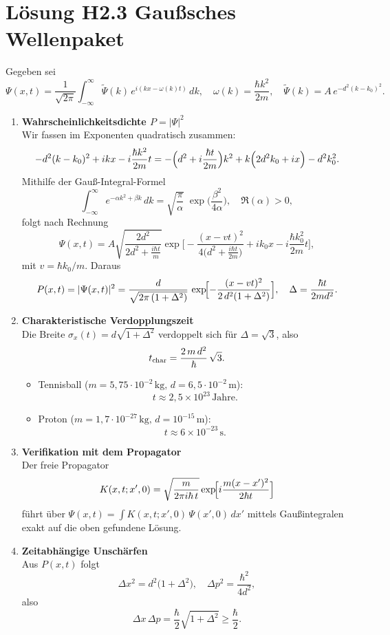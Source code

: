 \documentclass[a4paper,12pt]{article}
\begin{document}
\section*{Lösung H2.3 Gaußsches Wellenpaket}

Gegeben sei
\[
\Psi(x,t)
=\frac{1}{\sqrt{2\pi}}
\int_{-\infty}^{\infty}
\tilde\Psi(k)\,e^{i(kx-\omega(k)t)}\,dk,
\quad
\omega(k)=\frac{\hbar k^2}{2m},
\quad
\tilde\Psi(k)=A\,e^{-d^2(k-k_0)^2}.
\]

\begin{enumerate}[label=(\alph*)]

\item \textbf{Wahrscheinlichkeitsdichte \(P=|\Psi|^2\)}\\
Wir fassen im Exponenten quadratisch zusammen:
\[
-d^2(k-k_0)^2 + i k x - i\frac{\hbar k^2}{2m}t
=
-\Bigl(d^2 + i\frac{\hbar t}{2m}\Bigr)k^2
+ k\Bigl(2d^2k_0 + i x\Bigr)
- d^2k_0^2.
\]
Mithilfe der Gauß-Integral-Formel
\[
\int_{-\infty}^\infty e^{-\alpha k^2+\beta k}\,dk
=\sqrt{\frac{\pi}{\alpha}}\;
\exp\!\biggl(\frac{\beta^2}{4\alpha}\biggr),
\quad \Re(\alpha)>0,
\]
folgt nach Rechnung
\[
\Psi(x,t)
=A\sqrt{\frac{2d^2}{2d^2 + \tfrac{i\hbar t}{m}}}
\exp\!\Biggl[
-\frac{(x-vt)^2}{4\bigl(d^2 + \tfrac{i\hbar t}{2m}\bigr)}
+ i k_0 x - i\frac{\hbar k_0^2}{2m}t
\Biggr],
\]
mit \(v=\hbar k_0/m\). Daraus
\[
P(x,t)=|\Psi(x,t)|^2
=\frac{d}{\sqrt{2\pi\,(1+\Delta^2)}}\,
\exp\!\Bigl[-\frac{(x-vt)^2}{2\,d^2(1+\Delta^2)}\Bigr],
\quad
\Delta=\frac{\hbar t}{2 m d^2}.
\]

\item \textbf{Charakteristische Verdopplungszeit}\\
Die Breite \(\sigma_x(t)=d\sqrt{1+\Delta^2}\) verdoppelt sich für
\(\Delta=\sqrt{3}\), also
\[
t_{\rm char}
=\frac{2\,m\,d^2}{\hbar}\,\sqrt{3}.
\]
\begin{itemize}[leftmargin=*]
  \item Tennisball (\(m=5,75\cdot10^{-2}\,\mathrm{kg},\,d=6,5\cdot10^{-2}\,\mathrm m\)):
  \[
  t\approx2{,}5\times10^{23}\,\mathrm{Jahre}.
  \]
  \item Proton (\(m=1,7\cdot10^{-27}\,\mathrm{kg},\,d=10^{-15}\,\mathrm m\)):
  \[
  t\approx6\times10^{-23}\,\mathrm{s}.
  \]
\end{itemize}

\item \textbf{Verifikation mit dem Propagator}\\
Der freie Propagator
\[
K(x,t;x',0)
=\sqrt{\frac{m}{2\pi i\hbar\,t}}
\exp\!\Bigl[i\frac{m(x-x')^2}{2\hbar t}\Bigr]
\]
führt über
\(\Psi(x,t)=\int K(x,t;x',0)\,\Psi(x',0)\,dx'\)
mittels Gaußintegralen exakt auf die oben gefundene Lösung.

\item \textbf{Zeitabhängige Unschärfen}\\
Aus \(P(x,t)\) folgt
\[
\Delta x^2 = d^2\bigl(1+\Delta^2\bigr),
\quad
\Delta p^2 = \frac{\hbar^2}{4d^2},
\]
also
\[
\Delta x\,\Delta p
=\frac{\hbar}{2}\sqrt{1+\Delta^2}
\ge\frac{\hbar}{2}.
\]
\end{enumerate}
\end{document}
